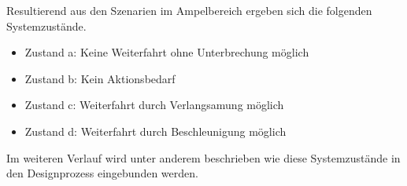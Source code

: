 Resultierend aus den Szenarien im Ampelbereich ergeben sich die folgenden Systemzustände.
\begin{itemize}
	\item Zustand a: Keine Weiterfahrt ohne Unterbrechung möglich
	\item Zustand b: Kein Aktionsbedarf
	\item Zustand c: Weiterfahrt durch Verlangsamung möglich
	\item Zustand d: Weiterfahrt durch Beschleunigung möglich
\end{itemize}
Im weiteren Verlauf wird unter anderem beschrieben wie diese Systemzustände in den Designprozess eingebunden werden.
